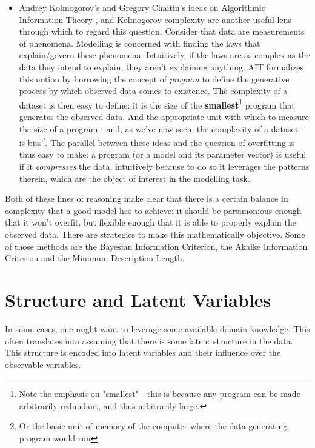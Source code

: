 \begin{itemize}
    \item Andrey Kolmogorov's and Gregory Chaitin's ideas on Algorithmic Information
        Theory \cite{chaitin-leibniz}, and Kolmogorov complexity  are another
        useful lens through which to regard this question. Consider that data are
        measurements of phenomena. Modelling is concerned with finding the
        laws that explain/govern these phenomena. Intuitively, if the laws are
        as complex as the data they intend to explain, they aren't explaining anything.
        AIT formalizes this notion by borrowing the concept of \emph{program} to
        define the generative process by which observed data comes to existence.
        The complexity of a dataset is then easy to define: it is the size of
        the \textbf{smallest}\footnote{Note the emphasis on "smallest" - this is
        because any program can be made arbitrarily redundant, and thus arbitrarily large.}
        program that generates the observed data. And the appropriate unit with
        which to measure the size of a program - and, as we've now seen, the
        complexity of a dataset - is bits\footnote{Or the basic unit of memory
        of the computer where the data generating program would run}. The parallel
        between these ideas and the question of overfitting is thus easy to make:
        a program (or a model and its parameter vector)  is useful if it 
        \emph{compresses} the data, intuitively because to do so it leverages the
        patterns therein, which are the object of interest in the modelling task.
\end{itemize}

Both of these lines of reasoning make clear that there is a certain balance
in complexity that a good model has to achieve: it should be parsimonious enough
that it won't overfit, but flexible enough that it is able to properly explain
the observed data.  There are strategies to make this mathematically objective.
Some of those methods are the Bayesian Information Criterion, the Akaike
Information Criterion and the Minimum Description Length.

\section{Structure and Latent Variables}
\label{section:probmodellatvar}
In some cases, one might want to leverage some available domain knowledge. This
often translates into assuming that there is some latent structure in the data.
This structure is encoded into latent variables and their influence over the
observable variables.

